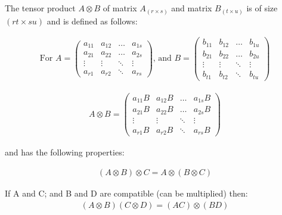 \begin{property}
\begin{property}
\begin{definition}

The tensor product $A \otimes B$ of matrix $A_{(r \times s)}$ and matrix $B_{(t \times u)}$ is of size $(rt \times su)$ and is defined as follows:

\begin{align*}
\text{For }
A = \begin{pmatrix}
    a_{11} & a_{12} & \dots  & a_{1s} \\
    a_{21} & a_{22} & \dots  & a_{2s} \\
    \vdots & \vdots & \ddots & \vdots \\
    a_{r1} & a_{r2} & \ddots & a_{rs}
\end{pmatrix}
\text{, and }
B = \begin{pmatrix}
    b_{11} & b_{12} & \dots  & b_{1u} \\
    b_{21} & b_{22} & \dots  & b_{2u} \\
    \vdots & \vdots & \ddots & \vdots \\
    b_{t1} & b_{t2} & \ddots & b_{tu}
\end{pmatrix}
\end{align*}

\begin{align*}
A \otimes B = \begin{pmatrix}
    a_{11}B & a_{12}B & \dots  & a_{1s}B \\
    a_{21}B & a_{22}B & \dots  & a_{2s}B \\
    \vdots  & \vdots  & \ddots & \vdots  \\
    a_{r1}B & a_{r2}B & \ddots & a_{rs}B
\end{pmatrix}
\end{align*}

\end{definition}

and has the following properties:


\begin{property}[Associativity]
\begin{align*}
  (A \otimes B) \otimes C = A \otimes (B \otimes C)
\end{align*}
\end{property}

 If A and C; and B and D are compatible (can be multiplied) then:
\begin{align}
  (A \otimes B)(C \otimes D) = (AC) \otimes (BD)
\end{align}


\end{property}
\end{property}
